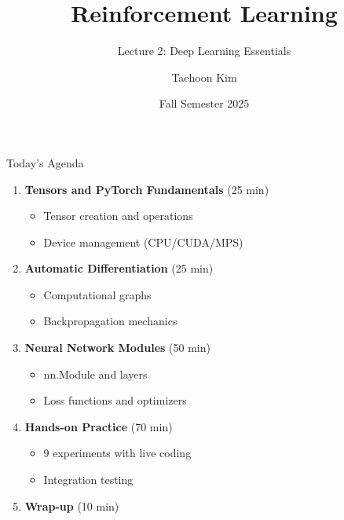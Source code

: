 \documentclass[aspectratio=169,10pt]{beamer}
\title{Reinforcement Learning}
\subtitle{Lecture 2: Deep Learning Essentials}
\author{Taehoon Kim}
\institute{Sogang University MIMIC Lab \\ \url{https://mimic-lab.com}}
\date{Fall Semester 2025}
\begin{document}

\frame{\titlepage}

\begin{frame}{Today's Agenda}
\begin{enumerate}
    \item \textbf{Tensors and PyTorch Fundamentals} (25 min)
    \begin{itemize}
        \item Tensor creation and operations
        \item Device management (CPU/CUDA/MPS)
    \end{itemize}
    \item \textbf{Automatic Differentiation} (25 min)
    \begin{itemize}
        \item Computational graphs
        \item Backpropagation mechanics
    \end{itemize}
    \item \textbf{Neural Network Modules} (50 min)
    \begin{itemize}
        \item nn.Module and layers
        \item Loss functions and optimizers
    \end{itemize}
    \item \textbf{Hands-on Practice} (70 min)
    \begin{itemize}
        \item 9 experiments with live coding
        \item Integration testing
    \end{itemize}
    \item \textbf{Wrap-up} (10 min)
\end{enumerate}
\end{frame}
\end{document}
